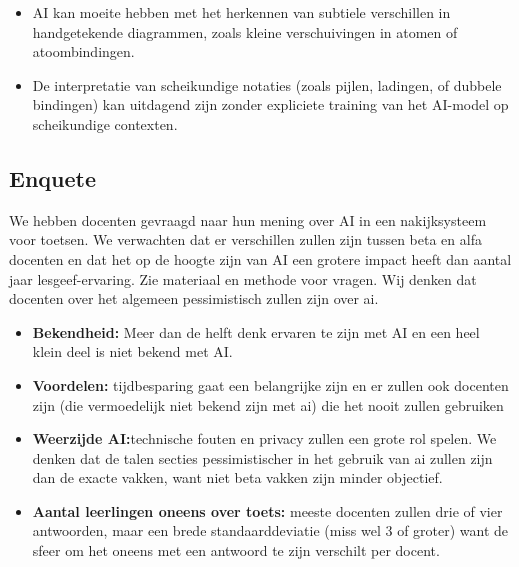 \documentclass[12pt]{article}
\begin{document}
\begin{multicols}{2}
\begin{minipage}{\linewidth}
\noindent\begin{itemize} 
    \item AI kan moeite hebben met het herkennen  van subtiele verschillen in handgetekende diagrammen, zoals kleine verschuivingen in atomen of atoombindingen. 
    \item De interpretatie van scheikundige notaties (zoals pijlen, ladingen, of dubbele bindingen) kan uitdagend zijn zonder expliciete training van het AI-model op scheikundige contexten. 
\end{itemize}
\end{minipage}

\pagebreak
\noindent\begin{minipage}{\linewidth}
    
\subsection{Enquete}

We hebben docenten gevraagd naar hun mening over AI in een nakijksysteem voor toetsen. We verwachten dat er verschillen zullen zijn tussen beta en alfa docenten en dat het op de hoogte zijn van AI een grotere impact heeft dan aantal jaar lesgeef-ervaring.
Zie materiaal en methode voor vragen.
Wij denken dat docenten over het algemeen pessimistisch zullen zijn over ai. \\
\noindent\begin{itemize}
\item \textbf{Bekendheid:} Meer dan de helft denk ervaren te zijn met AI en een heel klein deel is niet bekend met AI.
\item \textbf{Voordelen:} tijdbesparing gaat een belangrijke zijn en er zullen ook docenten zijn (die vermoedelijk niet bekend zijn met ai) die het nooit zullen gebruiken
\item \textbf{Weerzijde AI:}technische fouten en privacy zullen een grote rol spelen. We denken dat de talen secties pessimistischer in het gebruik van ai zullen zijn dan de exacte vakken, want niet beta vakken zijn minder objectief.
\item \textbf{Aantal leerlingen oneens over toets:} meeste docenten zullen drie of vier antwoorden, maar een brede standaarddeviatie (miss wel 3 of groter) want de sfeer om het oneens met een antwoord te zijn verschilt per docent.
\end{itemize}
\end{minipage}


\end{multicols}
\end{document}
